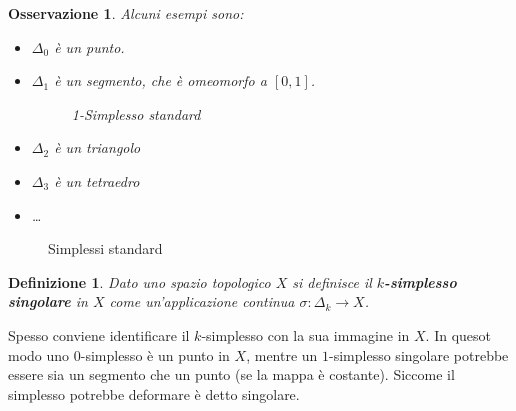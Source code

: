 \documentclass[10pt, twoside=false, x11names]{scrbook}
\newtheorem{osservation}[theorem]{Osservazione}
\newtheorem{definition}[theorem]{Definizione}
\begin{document}
\begin{osservation} Alcuni esempi sono:
  \begin{itemize}
  \item $ \Delta_0 $ è un punto.
  \item $ \Delta_1 $ è un segmento, che è omeomorfo a $ [0,1] $.
    \begin{figure}[htbp]
      \centering
      \caption{1-Simplesso standard}
      \label{fig:lez1:1_standard_simplex}
    \end{figure}
  \item $ \Delta_2 $ è un triangolo
  \item $ \Delta_3 $ è un tetraedro
  \item \dots
  \end{itemize}
\end{osservation}
    \begin{figure}[htbp]
      \centering
      \caption{Simplessi standard}
      \label{fig:lez1:standard_simplexes}
    \end{figure}

\begin{definition}
  Dato uno spazio topologico $ X $ si definisce il \textbf{$ k $-simplesso singolare}
  in $ X $ come un'applicazione continua $ \sigma: \Delta_k \to X $.
\end{definition}
Spesso conviene identificare il $ k $-simplesso con la sua immagine in $ X $.
In quesot modo uno $ 0 $-simplesso è un punto in $ X $, mentre un $ 1 $-simplesso singolare potrebbe essere sia un segmento che un punto (se la mappa è costante).
Siccome il simplesso potrebbe deformare è detto singolare.
\end{document}
